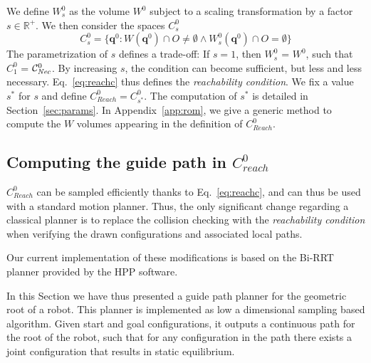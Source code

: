 We define $W^0_s$ as the volume $W^0$ subject to a scaling transformation by a factor $s \in \mathbb{R}^+$.
%
We then consider the spaces $C_{s}^0$
 \begin{equation}
 \label{eq:reachc}
C^0_s = \{ \mathbf{q}^0 : W(\mathbf{q}^{0}) \cap O \neq \emptyset \wedge W^0_s(\mathbf{q}^{0}) \cap O = \emptyset \} %
\end{equation}
%
The parametrization of $s$ defines a trade-off:
If $s=1$, then $W^0_s$ = $W^0$, such that $C_1^0$ = $\mathcal{C}^0_{\textrm{\it Nec}}$.
By increasing $s$, the condition can become sufficient, but less and less necessary.  
Eq.~\ref{eq:reachc} thus defines the \textit{reachability condition}. We fix a value $s^*$ for $s$ and define  $C_{Reach}^0 = C^0_{s^*}$.
The computation of $s^*$ is detailed in Section~\ref{sec:params}. 
In Appendix~\ref{app:rom}, we give a generic method to compute the $W$ volumes appearing in the definition of $C_{Reach}^0$.

\subsection{Computing the guide path in $C_{reach}^0$}
$C_{Reach}^0$ can be sampled efficiently thanks to Eq.~\ref{eq:reachc}, and can thus be used with a standard motion planner.
Thus, the only significant change regarding a classical planner is to replace the collision checking with the \textit{reachability condition} when verifying
the drawn configurations and associated local paths.

Our current implementation of these modifications is based on the Bi-RRT planner \citep{770022} provided by the HPP software.

In this Section we have thus presented a guide path planner for the geometric root of a robot. This planner is implemented as low a dimensional sampling based 
algorithm. Given start and goal configurations, it outputs a continuous path for the root of the robot, such that for any configuration in the path there exists a joint
configuration that results in static equilibrium.

